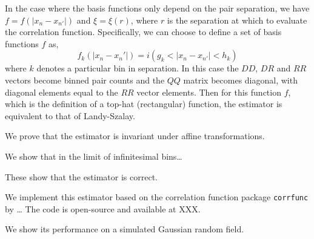 \documentclass[modern]{aastex62}
\newcommand{\cf}{2pcf\xspace} %
\newcommand{\inv}{^{-1}}
\begin{document}
\iffalse %
\begin{eqnarray}\displaystyle
DD_k &\equiv& \sum_{n n'} f_k(T_n, T_{n'}) \\
DR_k &\equiv& \sum_{n m} f_k(T_n, T_{m}) \\
RR_k &\equiv& \sum_{m m'} f_k(T_m, T_{m'}) \\
QQ_{kl} &\equiv& \sum_{m m'} f_k(T_m, T_{m'}) f_l(T_m, T_{m'}),
\end{eqnarray}
Then, we can compute the \cf as
\begin{eqnarray}\displaystyle
\xi_k(T_j, T_{j'}) &\equiv& a_k f_k(T_j, T_{j'}) \\
a_k &\equiv& [QQ\inv]_{kl} (DD_l + 2DR_l - RR_l) 
\end{eqnarray}
where $k$ now indexes the basis functions, $T$ refers to all of the data for the given tracer, and $QQ_{kl}$ is the product of basis function indexed by $k$ and $l$ for the random--random pairs.
\fi

In the case where the basis functions only depend on the pair separation, we have $f = f(|x_n - x_{n'}|)$ and $\xi = \xi(r)$, where $r$ is the separation at which to evaluate the correlation function.
Specifically, we can choose to define a set of basis functions $f$ as,
\begin{equation}
f_k(|x_n - x_n'|) =  i(g_k < |x_n - x_{n'}| < h_k)
\end{equation}
where $k$ denotes a particular bin in separation.
In this case the $DD$, $DR$ and $RR$ vectors become binned pair counts and the $QQ$ matrix becomes diagonal, with diagonal elements equal to the $RR$ vector elements. %
Then for this function $f$, which is the definition of a top-hat (rectangular) function, the estimator is equivalent to that of Landy-Szalay.

We prove that the estimator is invariant under affine transformations.

We show that in the limit of infinitesimal bins\ldots

These show that the estimator is correct.

We implement this estimator based on the correlation function package \texttt{corrfunc} by \citep{citeXXX} \ldots
The code is open-source and available at XXX.

We show its performance on a simulated Gaussian random field.
\end{document}
